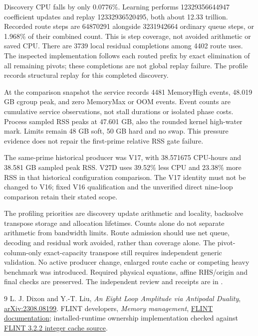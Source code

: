 \documentclass[11pt]{article}
\begin{document}
Discovery CPU falls by only 0.0776\%. Learning performs
12329356644947 coefficient updates and replay 12332936520495, both about
12.33 trillion. Recorded route steps are 64870291 alongside 3231942664
ordinary queue steps, or 1.968\% of their combined count. This is step
coverage, not avoided arithmetic or saved CPU. There are 3739 local residual
completions among 4402 route uses. The inspected implementation follows
each routed prefix by exact elimination of all remaining pivots; these
completions are not global replay failure. The profile records structural
replay for this completed discovery.

At the comparison snapshot the service records 4481 MemoryHigh events,
48.019 GB cgroup peak, and zero MemoryMax or OOM events. Event counts are
cumulative service observations, not stall durations or isolated phase
costs. Process sampled RSS peaks at 47.601 GB, also the rounded kernel
high-water mark. Limits remain 48 GB soft, 50 GB hard and no swap. This
pressure evidence does not repair the first-prime relative RSS gate failure.

The same-prime historical producer was V17, with 38.571675 CPU-hours and
38.581 GB sampled peak RSS. V27D uses 39.52\% less CPU and 23.38\% more
RSS in that historical configuration comparison. The V17 identity must
not be changed to V16; fixed V16 qualification and the unverified direct
nine-loop comparison retain their stated scope.

The profiling priorities are discovery update arithmetic and locality,
backsolve transpose storage and allocation lifetimes. Counts alone do not
separate arithmetic from bandwidth limits. Route admission should use net
queue, decoding and residual work avoided, rather than coverage alone.
The pivot-column-only exact-capacity transpose still requires independent
generic validation. No active producer change, enlarged route cache or
competing heavy benchmark was introduced. Required physical equations,
affine RHS/origin and final checks are preserved. The independent review
and receipts are in .


\begin{thebibliography}{9}
L. J. Dixon and Y.-T. Liu,
\emph{An Eight Loop Amplitude via Antipodal Duality},
\href{https://arxiv.org/abs/2308.08199}{arXiv:2308.08199}.
FLINT developers, \emph{Memory management},
\href{https://flintlib.org/doc/memory.html}{FLINT documentation};
installed-runtime ownership implementation checked against
\href{https://github.com/flintlib/flint/blob/v3.2.2/src/fmpz/link/fmpz_single.c}{FLINT 3.2.2 integer cache source}.
\end{thebibliography}
\end{document}
